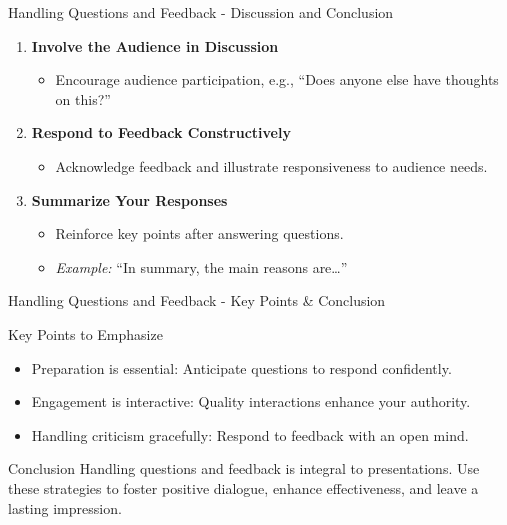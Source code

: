 \documentclass[aspectratio=169]{beamer}
\begin{document}
\begin{frame}[fragile]{Handling Questions and Feedback - Discussion and Conclusion}
    \begin{enumerate}
        \item \textbf{Involve the Audience in Discussion}
            \begin{itemize}
                \item Encourage audience participation, e.g., “Does anyone else have thoughts on this?”
            \end{itemize}
        \item \textbf{Respond to Feedback Constructively}
            \begin{itemize}
                \item Acknowledge feedback and illustrate responsiveness to audience needs.
            \end{itemize}
        \item \textbf{Summarize Your Responses}
            \begin{itemize}
                \item Reinforce key points after answering questions. 
                \item \textit{Example:} “In summary, the main reasons are…”
            \end{itemize}
    \end{enumerate}
\end{frame}

\begin{frame}[fragile]{Handling Questions and Feedback - Key Points & Conclusion}
    \begin{block}{Key Points to Emphasize}
        \begin{itemize}
            \item Preparation is essential: Anticipate questions to respond confidently.
            \item Engagement is interactive: Quality interactions enhance your authority.
            \item Handling criticism gracefully: Respond to feedback with an open mind.
        \end{itemize}
    \end{block}
    
    \begin{block}{Conclusion}
        Handling questions and feedback is integral to presentations. Use these strategies to foster positive dialogue, enhance effectiveness, and leave a lasting impression.
    \end{block}
\end{frame}
\end{document}
